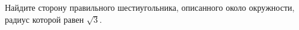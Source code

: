 \begin{ex}
	\begin{condition}
		Найдите сторону правильного шестиугольника, описанного около окружности, радиус которой равен \( \sqrt{3} \).
	\end{condition}
\end{ex}